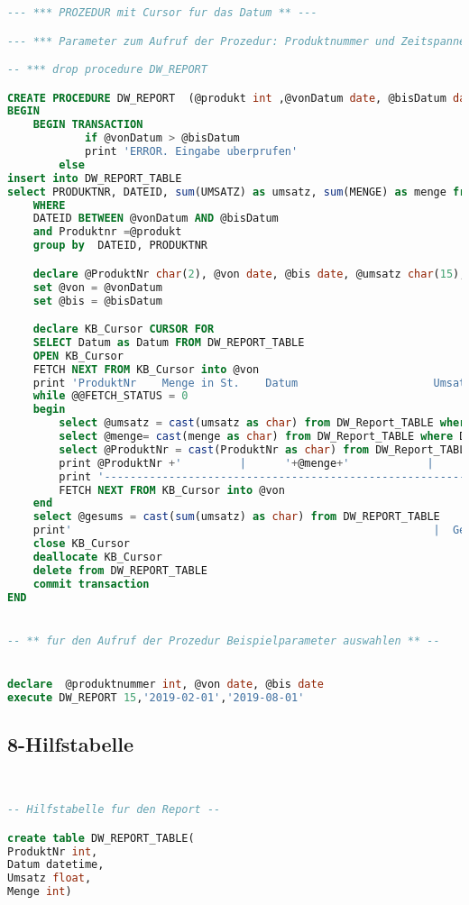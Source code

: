 \begin{lstlisting}[language=SQL]
  --- *** PROZEDUR mit Cursor fur das Datum ** ---

--- *** Parameter zum Aufruf der Prozedur: Produktnummer und Zeitspanne ** --

-- *** drop procedure DW_REPORT

CREATE PROCEDURE DW_REPORT  (@produkt int ,@vonDatum date, @bisDatum date) AS
BEGIN
	BEGIN TRANSACTION
			if @vonDatum > @bisDatum
			print 'ERROR. Eingabe uberprufen'
		else
insert into DW_REPORT_TABLE
select PRODUKTNR, DATEID, sum(UMSATZ) as umsatz, sum(MENGE) as menge from KASSENBON_FAKTEN
	WHERE
	DATEID BETWEEN @vonDatum AND @bisDatum
	and Produktnr =@produkt
	group by  DATEID, PRODUKTNR

	declare @ProduktNr char(2), @von date, @bis date, @umsatz char(15), @menge char(4), @gesums char(10);
	set @von = @vonDatum
	set @bis = @bisDatum

	declare KB_Cursor CURSOR FOR
	SELECT Datum as Datum FROM DW_REPORT_TABLE
	OPEN KB_Cursor
	FETCH NEXT FROM KB_Cursor into @von
	print 'ProduktNr    Menge in St.    Datum                     Umsatz in EU'
	while @@FETCH_STATUS = 0
	begin
		select @umsatz = cast(umsatz as char) from DW_Report_TABLE where Datum = @von
		select @menge= cast(menge as char) from DW_Report_TABLE where Datum = @von
		select @ProduktNr = cast(ProduktNr as char) from DW_Report_TABLE where Datum = @von
		print @ProduktNr +'         |      '+@menge+'            |      '+cast(@von as char)+'|    '+@umsatz+'|'
		print '-------------------------------------------------------------------------------------------|'
		FETCH NEXT FROM KB_Cursor into @von
	end
	select @gesums = cast(sum(umsatz) as char) from DW_REPORT_TABLE
	print'                                                        |  Gesamtumsatz (EU) :   '+@gesums+'      |'
	close KB_Cursor
	deallocate KB_Cursor
	delete from DW_REPORT_TABLE
	commit transaction
END


-- ** fur den Aufruf der Prozedur Beispielparameter auswahlen ** --


declare  @produktnummer int, @von date, @bis date
execute DW_REPORT 15,'2019-02-01','2019-08-01'
\end{lstlisting}

\subsection{8-Hilfstabelle}

\begin{lstlisting}[language=SQL]


-- Hilfstabelle fur den Report --

create table DW_REPORT_TABLE(
ProduktNr int,
Datum datetime,
Umsatz float,
Menge int)

\end{lstlisting}


